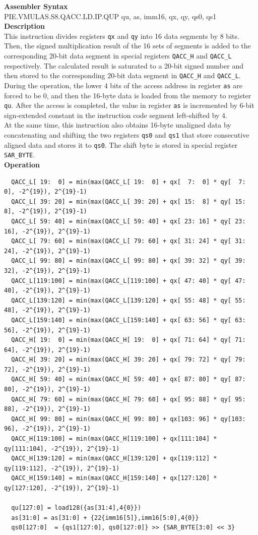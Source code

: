 \textbf{Assembler Syntax} \\
PIE.VMULAS.S8.QACC.LD.IP.QUP qu, as, imm16, qx, qy, qs0, qs1 \\
\textbf{Description} \\
This instruction divides registers \lstinline{qx} and \lstinline{qy} into 16 data segments by 8 bits. Then, the signed multiplication result of the 16 sets of segments is added to the corresponding 20-bit data segment in special registers \lstinline{QACC_H} and \lstinline{QACC_L} respectively. The calculated result is saturated to a 20-bit signed number and then stored to the corresponding 20-bit data segment in \lstinline{QACC_H} and \lstinline{QACC_L}.\\
During the operation, the lower 4 bits of the access address in register \lstinline{as} are forced to be 0, and then the 16-byte data is loaded from the memory to register \lstinline{qu}. After the access is completed, the value in register \lstinline{as} is incremented by 6-bit sign-extended constant in the instruction code segment left-shifted by 4.\\
At the same time, this instruction also obtains 16-byte unaligned data by concatenating and shifting the two registers \lstinline{qs0} and \lstinline{qs1} that store consecutive aligned data and stores it to \lstinline{qs0}. The shift byte is stored in special register \lstinline{SAR_BYTE}.\\
\textbf{Operation}
\begin{lstlisting}
  QACC_L[ 19:  0] = min(max(QACC_L[ 19:  0] + qx[  7:  0] * qy[  7:  0], -2^{19}), 2^{19}-1)
  QACC_L[ 39: 20] = min(max(QACC_L[ 39: 20] + qx[ 15:  8] * qy[ 15:  8], -2^{19}), 2^{19}-1)
  QACC_L[ 59: 40] = min(max(QACC_L[ 59: 40] + qx[ 23: 16] * qy[ 23: 16], -2^{19}), 2^{19}-1)
  QACC_L[ 79: 60] = min(max(QACC_L[ 79: 60] + qx[ 31: 24] * qy[ 31: 24], -2^{19}), 2^{19}-1)
  QACC_L[ 99: 80] = min(max(QACC_L[ 99: 80] + qx[ 39: 32] * qy[ 39: 32], -2^{19}), 2^{19}-1)
  QACC_L[119:100] = min(max(QACC_L[119:100] + qx[ 47: 40] * qy[ 47: 40], -2^{19}), 2^{19}-1)
  QACC_L[139:120] = min(max(QACC_L[139:120] + qx[ 55: 48] * qy[ 55: 48], -2^{19}), 2^{19}-1)
  QACC_L[159:140] = min(max(QACC_L[159:140] + qx[ 63: 56] * qy[ 63: 56], -2^{19}), 2^{19}-1)
  QACC_H[ 19:  0] = min(max(QACC_H[ 19:  0] + qx[ 71: 64] * qy[ 71: 64], -2^{19}), 2^{19}-1)
  QACC_H[ 39: 20] = min(max(QACC_H[ 39: 20] + qx[ 79: 72] * qy[ 79: 72], -2^{19}), 2^{19}-1)
  QACC_H[ 59: 40] = min(max(QACC_H[ 59: 40] + qx[ 87: 80] * qy[ 87: 80], -2^{19}), 2^{19}-1)
  QACC_H[ 79: 60] = min(max(QACC_H[ 79: 60] + qx[ 95: 88] * qy[ 95: 88], -2^{19}), 2^{19}-1)
  QACC_H[ 99: 80] = min(max(QACC_H[ 99: 80] + qx[103: 96] * qy[103: 96], -2^{19}), 2^{19}-1)
  QACC_H[119:100] = min(max(QACC_H[119:100] + qx[111:104] * qy[111:104], -2^{19}), 2^{19}-1)
  QACC_H[139:120] = min(max(QACC_H[139:120] + qx[119:112] * qy[119:112], -2^{19}), 2^{19}-1)
  QACC_H[159:140] = min(max(QACC_H[159:140] + qx[127:120] * qy[127:120], -2^{19}), 2^{19}-1)

  qu[127:0] = load128({as[31:4],4{0}})
  as[31:0] = as[31:0] + {22{imm16[5]},imm16[5:0],4{0}}
  qs0[127:0]  = {qs1[127:0], qs0[127:0]} >> {SAR_BYTE[3:0] << 3}
\end{lstlisting}

